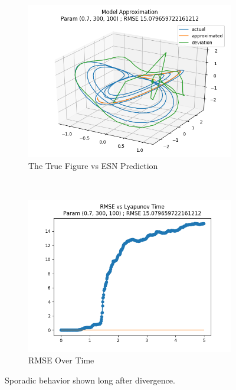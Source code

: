 \documentclass{article}
\begin{document}
\begin{figure}[H]
    \centering
    \begin{subfigure}[b]{0.45\textwidth}
        \includegraphics[width=\textwidth]{doc/paper/images/lorenz/rank_7_param_73_fit.png}
        \caption{The True Figure vs ESN Prediction}
        \label{fig:lorenz_r7_fit}
    \end{subfigure}
    ~
    \begin{subfigure}[b]{0.45\textwidth}
        \includegraphics[width=\textwidth]{doc/paper/images/lorenz/rank_7_param_73_rmse.png}
        \caption{RMSE Over Time}
        \label{fig:lorenz_r7_rmse}
    \end{subfigure}
    \caption{Sporadic behavior shown long after divergence.}
    \label{fig:lorenz_r7}
\end{figure}
\end{document}
